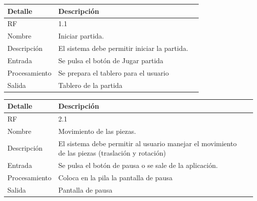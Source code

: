 \documentclass{article}
\begin{document}
\begin{table}[H]
  \begin{center}
    \begin{tabularx}{\linewidth}{|X|X|X|} %
      \hline
      \textbf{Detalle} & \textbf{Descripción}\\
      \hline
      RF & 1.1 \\
      \hline
      Nombre & Iniciar partida.\\
      \hline
      Descripción &  El sistema debe permitir iniciar la partida.\\
      \hline
      Entrada & Se pulsa el botón de Jugar partida\\
      \hline
      Procesamiento &  Se prepara el tablero para el usuario\\
      \hline
      Salida & Tablero de la partida\\
      \hline
    \end{tabularx}
  \end{center}
\end{table}

\begin{table}[H]
  \begin{center}
    \begin{tabularx}{\linewidth}{|X|X|X|} %
      \hline
      \textbf{Detalle} & \textbf{Descripción}\\
      \hline
      RF & 2.1 \\
      \hline
      Nombre & Movimiento de las piezas.\\
      \hline
      Descripción & El sistema debe permitir al usuario manejar el movimiento de las piezas (traslación y rotación)\\
      \hline
      Entrada & Se pulsa el botón de pausa o se sale de la aplicación.\\
      \hline
      Procesamiento & Coloca en la pila la pantalla de pausa\\
      \hline
      Salida & Pantalla de pausa\\
      \hline
    \end{tabularx}
  \end{center}
\end{table}
\end{document}
